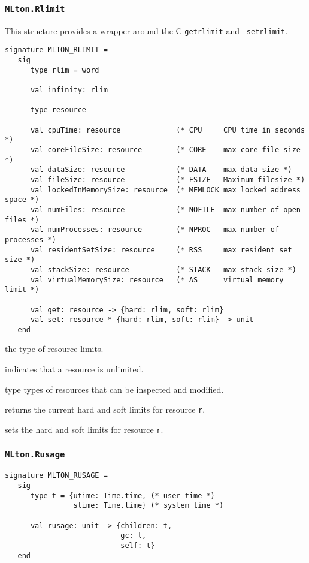 \subsubsection{\tt MLton.Rlimit}
This structure provides a wrapper around the C {\tt getrlimit} and {\tt
setrlimit}.
\begin{verbatim}
signature MLTON_RLIMIT =
   sig
      type rlim = word
               
      val infinity: rlim

      type resource
               
      val cpuTime: resource             (* CPU     CPU time in seconds *)
      val coreFileSize: resource        (* CORE    max core file size *)
      val dataSize: resource            (* DATA    max data size *)
      val fileSize: resource            (* FSIZE   Maximum filesize *)
      val lockedInMemorySize: resource  (* MEMLOCK max locked address space *)
      val numFiles: resource            (* NOFILE  max number of open files *)  
      val numProcesses: resource        (* NPROC   max number of processes *)
      val residentSetSize: resource     (* RSS     max resident set size *)
      val stackSize: resource           (* STACK   max stack size *)
      val virtualMemorySize: resource   (* AS      virtual memory limit *)
      
      val get: resource -> {hard: rlim, soft: rlim}
      val set: resource * {hard: rlim, soft: rlim} -> unit
   end
\end{verbatim}

\begin{description}
the type of resource limits.

indicates that a resource is unlimited.

type types of resources that can be inspected and modified.

returns the current hard and soft limits for resource {\tt r}.

sets the hard and soft limits for resource {\tt r}.
\end{description}

\subsubsection{\tt MLton.Rusage}
\begin{verbatim}
signature MLTON_RUSAGE =
   sig
      type t = {utime: Time.time, (* user time *)
                stime: Time.time} (* system time *)
         
      val rusage: unit -> {children: t,
                           gc: t,
                           self: t}
   end
\end{verbatim}


